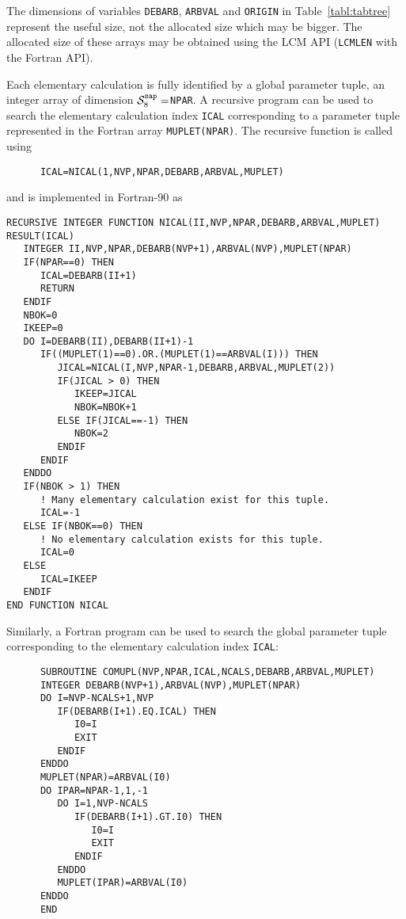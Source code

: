 The dimensions of variables {\tt DEBARB}, {\tt ARBVAL} and {\tt ORIGIN} in Table~\ref{tabl:tabtree} represent
the useful size, not the allocated size which may be bigger. The allocated size of these arrays may be obtained
using the LCM API ({\tt LCMLEN} with the Fortran API).

\vskip 0.1cm

Each elementary calculation is fully identified by a global parameter tuple, an integer array of dimension
$\mathcal{S}^{\tt sap}_8=${\tt NPAR}. A recursive program can be used to search the elementary calculation
index {\tt ICAL} corresponding to a parameter tuple represented in the Fortran array {\tt MUPLET(NPAR)}.
The recursive function is called using
\begin{verbatim}
      ICAL=NICAL(1,NVP,NPAR,DEBARB,ARBVAL,MUPLET)
\end{verbatim}

\noindent and is implemented in Fortran-90 as
\begin{verbatim}
RECURSIVE INTEGER FUNCTION NICAL(II,NVP,NPAR,DEBARB,ARBVAL,MUPLET) RESULT(ICAL)
   INTEGER II,NVP,NPAR,DEBARB(NVP+1),ARBVAL(NVP),MUPLET(NPAR)
   IF(NPAR==0) THEN
      ICAL=DEBARB(II+1)
      RETURN
   ENDIF
   NBOK=0
   IKEEP=0
   DO I=DEBARB(II),DEBARB(II+1)-1
      IF((MUPLET(1)==0).OR.(MUPLET(1)==ARBVAL(I))) THEN
         JICAL=NICAL(I,NVP,NPAR-1,DEBARB,ARBVAL,MUPLET(2))
         IF(JICAL > 0) THEN
            IKEEP=JICAL
            NBOK=NBOK+1
         ELSE IF(JICAL==-1) THEN
            NBOK=2
         ENDIF
      ENDIF
   ENDDO
   IF(NBOK > 1) THEN
      ! Many elementary calculation exist for this tuple.
      ICAL=-1
   ELSE IF(NBOK==0) THEN
      ! No elementary calculation exists for this tuple.
      ICAL=0
   ELSE
      ICAL=IKEEP
   ENDIF
END FUNCTION NICAL
\end{verbatim}

\vskip 0.1cm

Similarly, a Fortran program can be used to search the global parameter tuple corresponding to
the elementary calculation index {\tt ICAL}:

\begin{verbatim}
      SUBROUTINE COMUPL(NVP,NPAR,ICAL,NCALS,DEBARB,ARBVAL,MUPLET)
      INTEGER DEBARB(NVP+1),ARBVAL(NVP),MUPLET(NPAR)
      DO I=NVP-NCALS+1,NVP
         IF(DEBARB(I+1).EQ.ICAL) THEN
            I0=I
            EXIT
         ENDIF
      ENDDO
      MUPLET(NPAR)=ARBVAL(I0)
      DO IPAR=NPAR-1,1,-1
         DO I=1,NVP-NCALS
            IF(DEBARB(I+1).GT.I0) THEN
               I0=I
               EXIT
            ENDIF
         ENDDO
         MUPLET(IPAR)=ARBVAL(I0)
      ENDDO
      END
\end{verbatim}

